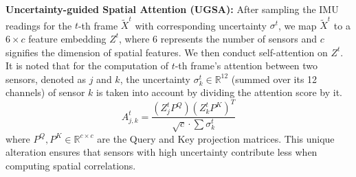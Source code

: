 \documentclass[letterpaper]{article} %
\begin{document}
\textbf{Uncertainty-guided Spatial Attention (UGSA):}
After sampling the IMU readings for the \(t\)-th frame \(\widetilde{X}^{t}\) with corresponding uncertainty \(\sigma^{t}\), we map \(\widetilde{X}^{t}\) to a \(6 \times c\) feature embedding \(Z^{t}\), where 6 represents the number of sensors and \(c\) signifies the dimension of spatial features. We then conduct self-attention \cite{vaswani2017attention} on ${Z}^{t}$.
It is noted that for the computation of $t$-th frame's attention between two sensors, denoted as $j$ and $k$, the uncertainty $\sigma_{k}^{t}\in \mathbb{R}^{12}$ (summed over its 12 channels) of sensor $k$ is taken into account by dividing the attention score by it.
\begin{equation}
A_{j,k}^{t}=\frac{\left(Z_j^{t} P^Q\right)\left(Z_k^{t} P^K\right)^T}{\sqrt{c} \cdot \sum{\sigma_k^{t}}}
\end{equation}
where $P^Q,P^K \in \mathbb{R}^{c\times c}$ are the Query and Key projection matrices. This unique alteration ensures that sensors with high uncertainty contribute less when computing spatial correlations.
\end{document}
